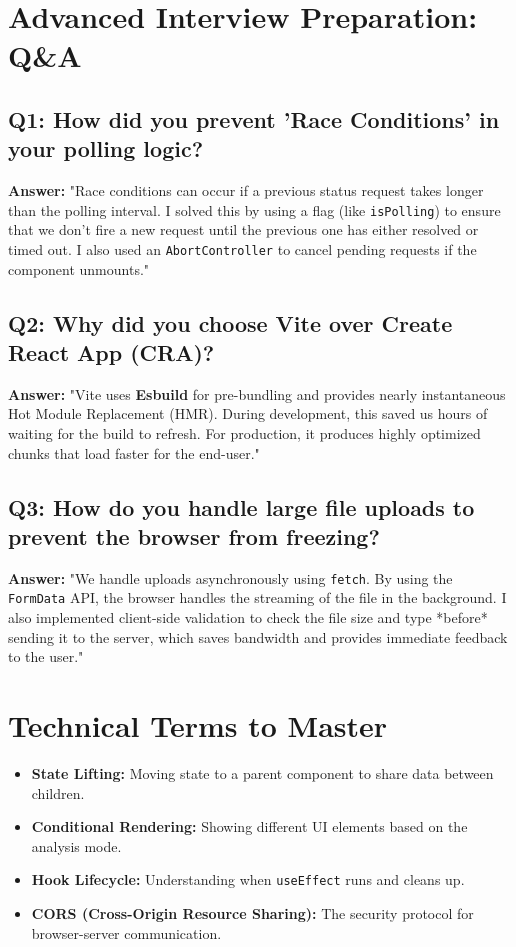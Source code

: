 \documentclass[12pt]{article}
\begin{document}
\section{Advanced Interview Preparation: Q&A}

\subsection{Q1: How did you prevent 'Race Conditions' in your polling logic?}
\textbf{Answer:} "Race conditions can occur if a previous status request takes longer than the polling interval. I solved this by using a flag (like \texttt{isPolling}) to ensure that we don't fire a new request until the previous one has either resolved or timed out. I also used an \texttt{AbortController} to cancel pending requests if the component unmounts."

\subsection{Q2: Why did you choose Vite over Create React App (CRA)?}
\textbf{Answer:} "Vite uses \textbf{Esbuild} for pre-bundling and provides nearly instantaneous Hot Module Replacement (HMR). During development, this saved us hours of waiting for the build to refresh. For production, it produces highly optimized chunks that load faster for the end-user."

\subsection{Q3: How do you handle large file uploads to prevent the browser from freezing?}
\textbf{Answer:} "We handle uploads asynchronously using \texttt{fetch}. By using the \texttt{FormData} API, the browser handles the streaming of the file in the background. I also implemented client-side validation to check the file size and type *before* sending it to the server, which saves bandwidth and provides immediate feedback to the user."

\section{Technical Terms to Master}
\begin{itemize}
    \item \textbf{State Lifting:} Moving state to a parent component to share data between children.
    \item \textbf{Conditional Rendering:} Showing different UI elements based on the analysis mode.
    \item \textbf{Hook Lifecycle:} Understanding when \texttt{useEffect} runs and cleans up.
    \item \textbf{CORS (Cross-Origin Resource Sharing):} The security protocol for browser-server communication.
\end{itemize}
\end{document}
